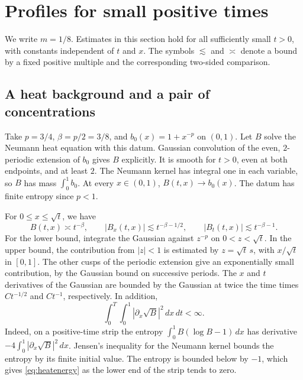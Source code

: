 \documentclass[11pt]{article}
\begin{document}
\section{Profiles for small positive times}

We write \(m=1/8\). Estimates in this section hold for all sufficiently
small \(t>0\), with constants independent of \(t\) and \(x\). The symbols
\(\lesssim\) and \(\asymp\) denote a bound by a fixed positive multiple and
the corresponding two-sided comparison.

\subsection{A heat background and a pair of concentrations}

Take \(p=3/4\), \(\beta=p/2=3/8\), and \(b_0(x)=1+x^{-p}\) on \((0,1)\).
Let \(B\) solve the Neumann heat equation with this datum. Gaussian
convolution of the even, \(2\)-periodic extension of \(b_0\) gives \(B\)
explicitly. It is smooth for \(t>0\), even at both endpoints, and at least
\(2\). The Neumann kernel has integral one in each variable, so \(B\)
has mass \(\int_0^1 b_0\). At every \(x\in(0,1)\), \(B(t,x)\to b_0(x)\).
The datum has finite entropy since \(p<1\).

For \(0\le x\le\sqrt t\), we have
\begin{equation}
 B(t,x)\asymp t^{-\beta},\qquad
 |B_x(t,x)|\lesssim t^{-\beta-1/2},\qquad
 |B_t(t,x)|\lesssim t^{-\beta-1}.
 \label{eq:heatbounds}
\end{equation}
For the lower bound, integrate the Gaussian against \(z^{-p}\) on
\(0<z<\sqrt t\). In the upper bound, the contribution from \(|z|<1\)
is estimated by \(z=\sqrt t\,s\), with \(x/\sqrt t\) in \([0,1]\).
The other cusps of the periodic extension give an exponentially small
contribution, by the Gaussian bound on successive periods. The \(x\)
and \(t\) derivatives of the Gaussian are bounded by the Gaussian at
twice the time times \(Ct^{-1/2}\) and \(Ct^{-1}\), respectively.
In addition,
\begin{equation}
 \int_0^T\!\int_0^1 |\partial_x\sqrt B|^2\,dx\,dt<\infty .
 \label{eq:heatenergy}
\end{equation}
Indeed, on a positive-time strip the entropy \(\int_0^1 B(\log B-1)\,dx\)
has derivative \(-4\int_0^1|\partial_x\sqrt B|^2\,dx\).
Jensen's inequality for the Neumann kernel bounds the entropy by its
finite initial value. The entropy is bounded below by \(-1\), which
gives \eqref{eq:heatenergy} as the lower end of the strip tends to zero.
\end{document}
